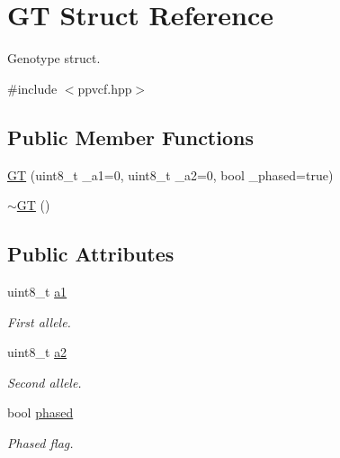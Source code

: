 \hypertarget{structGT}{}\section{GT Struct Reference}
\label{structGT}


Genotype struct.  




{\ttfamily \#include $<$ppvcf.\+hpp$>$}

\subsection*{Public Member Functions}
\begin{DoxyCompactItemize}
\item 
\mbox{\hyperlink{structGT_a438e28ad4edd7fdc672f7305014db30f}{GT}} (uint8\+\_\+t \+\_\+a1=0, uint8\+\_\+t \+\_\+a2=0, bool \+\_\+phased=true)
\item 
\mbox{\hyperlink{structGT_a44970fbc064a79cfb2d6a91126787b42}{$\sim$\+GT}} ()
\end{DoxyCompactItemize}
\subsection*{Public Attributes}
\begin{DoxyCompactItemize}
\item 
\mbox{\label{structGT_a8113989c1e3daec52fbd7470ff3ac363}} 
uint8\+\_\+t \mbox{\hyperlink{structGT_a8113989c1e3daec52fbd7470ff3ac363}{a1}}
\begin{DoxyCompactList}\small\item\em First allele. \end{DoxyCompactList}\item 
\mbox{\label{structGT_a699d791d9de036d0c738c2cb48d2e77a}} 
uint8\+\_\+t \mbox{\hyperlink{structGT_a699d791d9de036d0c738c2cb48d2e77a}{a2}}
\begin{DoxyCompactList}\small\item\em Second allele. \end{DoxyCompactList}\item 
\mbox{\label{structGT_a94f75bb27739d7eaf57938f27e9380aa}} 
bool \mbox{\hyperlink{structGT_a94f75bb27739d7eaf57938f27e9380aa}{phased}}
\begin{DoxyCompactList}\small\item\em Phased flag. \end{DoxyCompactList}\end{DoxyCompactItemize}


